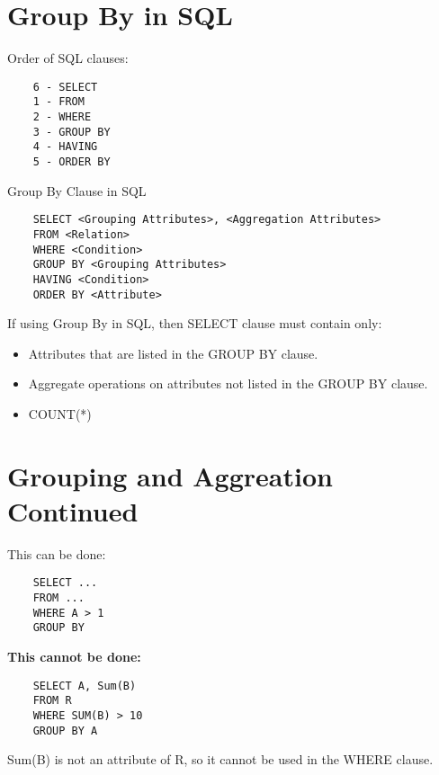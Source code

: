 \documentclass[twoside]{article}
\begin{document}
\section*{Group By in SQL}

Order of SQL clauses:
\begin{verbatim}
    6 - SELECT
    1 - FROM
    2 - WHERE
    3 - GROUP BY
    4 - HAVING
    5 - ORDER BY
\end{verbatim}

Group By Clause in SQL
\begin{verbatim}
    SELECT <Grouping Attributes>, <Aggregation Attributes>
    FROM <Relation>
    WHERE <Condition>
    GROUP BY <Grouping Attributes>
    HAVING <Condition>
    ORDER BY <Attribute>
\end{verbatim}

If using Group By in SQL, then SELECT clause must contain only:
\begin{itemize}
    \item Attributes that are listed in the GROUP BY clause.
    \item Aggregate operations on attributes not listed in the GROUP BY clause.
    \item COUNT(*)
\end{itemize}

\newpage
\hfill \break
{}

\section*{Grouping and Aggreation Continued}

This can be done:
\begin{verbatim}
    SELECT ...
    FROM ... 
    WHERE A > 1
    GROUP BY
\end{verbatim}

\textbf{This cannot be done:}
\begin{verbatim}
    SELECT A, Sum(B)
    FROM R
    WHERE SUM(B) > 10
    GROUP BY A
\end{verbatim}
Sum(B) is not an attribute of R, so it cannot be used in the WHERE clause.
\end{document}
